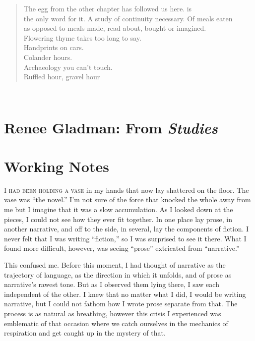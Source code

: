 \documentclass[
]{memoir}
\begin{document}
\begin{verse}
The egg from the other chapter has followed us here.  is\\
the only word for it. A study of continuity necessary. Of meals eaten\\
as opposed to meals made, read about, bought or imagined.\\
Flowering thyme takes too long to say.\\
Handprints on cars.\\
Colander hours.\\
Archaeology you can’t touch.\\
Ruffled hour, gravel hour\\
\end{verse}

~

\hypertarget{renee-gladman-from-studies}{%
\section*{\texorpdfstring{Renee Gladman: From
\emph{Studies}}{Renee Gladman: From Studies}}\label{renee-gladman-from-studies}}

\hypertarget{working-notes-3}{%
\section*{Working Notes}\label{working-notes-3}}

\lettrine[lines=3, findent=0em, nindent=0.1em, lhang=0]{I}{ had been holding a vase}
in my hands that now lay shattered on the floor. The vase was ``the
novel.'' I'm not sure of the force that knocked the whole away from me
but I imagine that it was a slow accumulation. As I looked down at the
pieces, I could not see how they ever fit together. In one place lay
prose, in another narrative, and off to the side, in several, lay the
components of fiction. I never felt that I was writing ``fiction,'' so I
was surprised to see it there. What I found more difficult, however, was
seeing ``prose'' extricated from ``narrative.''

This confused me. Before this moment, I had thought of narrative as the
trajectory of language, as the direction in which it unfolds, and of
prose as narrative's rawest tone. But as I observed them lying there, I
saw each independent of the other. I knew that no matter what I did, I
would be writing narrative, but I could not fathom how I wrote prose
separate from that. The process is as natural as breathing, however this
crisis I experienced was emblematic of that occasion where we catch
ourselves in the mechanics of respiration and get caught up in the
mystery of that.
\end{document}
